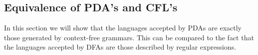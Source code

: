 \subsection{Equivalence of PDA's and CFL's}
In this section we will show that the languages accepted by PDAs are exactly those generated by context-free grammars.
This can be compared to the fact that the languages accepted by DFAs are those described by regular expressions.
